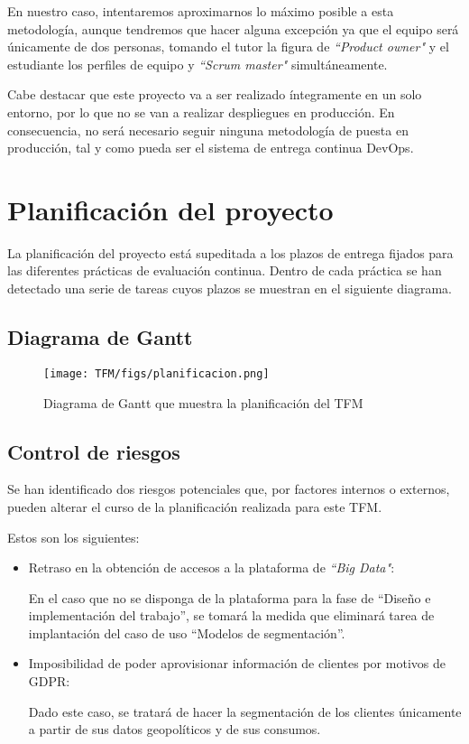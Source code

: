 En nuestro caso, intentaremos aproximarnos lo máximo posible a esta metodología, aunque tendremos que hacer alguna excepción ya que el equipo será únicamente de dos personas, tomando el tutor la figura de \textit{``Product owner"} y el estudiante los perfiles de equipo y \textit{``Scrum master"} simultáneamente. 

Cabe destacar que este proyecto va a ser realizado íntegramente en un solo entorno, por lo que no se van a realizar despliegues en producción. En consecuencia, no será necesario seguir ninguna metodología de puesta en producción, tal y como pueda ser el sistema de entrega continua DevOps\cite{walls}.


\section{Planificación del proyecto}

La planificación del proyecto está supeditada a los plazos de entrega fijados para las diferentes prácticas de evaluación continua. Dentro de cada práctica se han detectado una serie de tareas cuyos plazos se muestran en el siguiente diagrama. 

\subsection{Diagrama de Gantt}
\begin{figure}[H]
\centerline{\texttt{[image: TFM/figs/planificacion.png]}}
\caption{Diagrama de Gantt que muestra la planificación del TFM}
\label{fig:planificacion}
\end{figure}

\subsection{Control de riesgos} 

Se han identificado dos riesgos potenciales que, por factores internos o externos, pueden alterar el curso de la planificación realizada para este TFM.  

Estos son los siguientes: 
\begin{itemize}
    \item Retraso en la obtención de accesos a la plataforma de \textit{``Big Data"}:
    
En el caso que no se disponga de la plataforma para la fase de “Diseño e implementación del trabajo”, se tomará la medida que eliminará tarea de implantación del caso de uso “Modelos de segmentación”. 
    \item Imposibilidad de poder aprovisionar información de clientes por motivos de GDPR:

Dado este caso, se tratará de hacer la segmentación de los clientes únicamente a partir de sus datos geopolíticos y de sus consumos.
\end{itemize}
